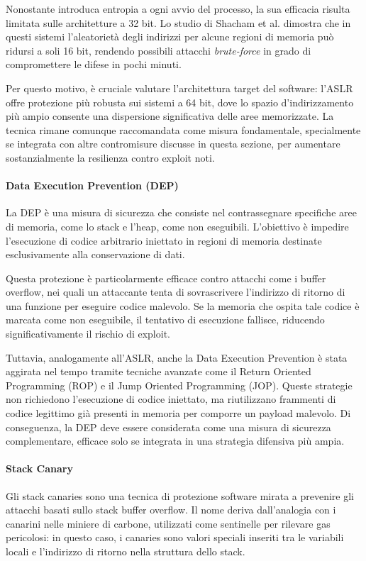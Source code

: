 Nonostante introduca entropia a ogni avvio del processo, la sua efficacia risulta
limitata sulle architetture a 32 bit. Lo studio di Shacham et al.\cite{aslr_effectiveness}
dimostra che in questi sistemi l'aleatorietà degli indirizzi per alcune regioni
di memoria può ridursi a soli 16 bit, rendendo possibili attacchi \textit{brute-force}
in grado di compromettere le difese in pochi minuti.

Per questo motivo, è cruciale valutare l'architettura target del software: l'ASLR
offre protezione più robusta sui sistemi a 64 bit, dove lo spazio d'indirizzamento
più ampio consente una dispersione significativa delle aree memorizzate. La
tecnica rimane comunque raccomandata come misura fondamentale, specialmente se integrata
con altre contromisure discusse in questa sezione, per aumentare sostanzialmente
la resilienza contro exploit noti.

\paragraph{Data Execution Prevention (DEP)}
La DEP è una misura di sicurezza che consiste nel contrassegnare specifiche aree
di memoria, come lo stack e l'heap, come non eseguibili. L'obiettivo è impedire
l'esecuzione di codice arbitrario iniettato in regioni di memoria destinate
esclusivamente alla conservazione di dati.

Questa protezione è particolarmente efficace contro attacchi come i buffer
overflow, nei quali un attaccante tenta di sovrascrivere l'indirizzo di ritorno di
una funzione per eseguire codice malevolo. Se la memoria che ospita tale codice
è marcata come non eseguibile, il tentativo di esecuzione fallisce, riducendo
significativamente il rischio di exploit.

Tuttavia, analogamente all'ASLR, anche la Data Execution Prevention è stata
aggirata nel tempo tramite tecniche avanzate come il Return Oriented Programming
(ROP) e il Jump Oriented Programming (JOP). Queste strategie non richiedono l'esecuzione
di codice iniettato, ma riutilizzano frammenti di codice legittimo già presenti
in memoria per comporre un payload malevolo. Di conseguenza, la DEP deve essere
considerata come una misura di sicurezza complementare, efficace solo se integrata
in una strategia difensiva più ampia.

\paragraph{Stack Canary}
Gli stack canaries sono una tecnica di protezione software mirata a prevenire
gli attacchi basati sullo stack buffer overflow. Il nome deriva dall'analogia con
i canarini nelle miniere di carbone, utilizzati come sentinelle per rilevare gas
pericolosi: in questo caso, i canaries sono valori speciali inseriti tra le
variabili locali e l'indirizzo di ritorno nella struttura dello stack.

